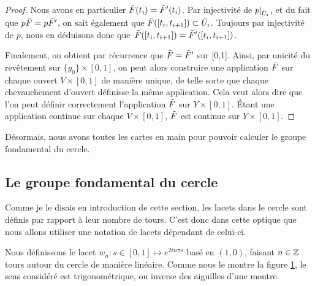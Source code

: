 \begin{proof}
Nous avons en particulier $\Tilde{F}(t_i)=\Tilde{F}'(t_i)$. Par injectivité de $p|_{\Tilde{U}_i}$, et du fait que $p\Tilde{F}=p\Tilde{F}'$, on sait également que $\Tilde{F}([t_i,t_{i+1}])\subset\Tilde{U}_i$. Toujours par injectivité de $p$, nous en déduisons donc que~$\Tilde{F}([t_i,t_{i+1}])=\Tilde{F}'([t_i,t_{i+1}])$.

\bigskip Finalement, on obtient par récurrence que $\Tilde{F}=\Tilde{F}'$ sur [0,1]. Ainsi, par unicité du revêtement sur $\{y_0\}\times[0,1]$, on peut alors construire une application $\Tilde{F}$ sur chaque ouvert $V\times[0,1]$ de manière unique, de telle sorte que chaque chevauchement d'ouvert définisse la même application. Cela veut alors dire que l'on peut définir correctement l'application $\Tilde{F}$ sur $Y\times[0,1]$. Étant une application continue sur chaque $V\times[0,1]$, $\Tilde{F}$ est continue sur $Y\times[0,1]$.
\end{proof}

Désormais, nous avons toutes les cartes en main pour pouvoir calculer le groupe fondamental du cercle.

\subsection{Le groupe fondamental du cercle}

\begin{figure}
    \centering
    \caption{}
    \label{fig:loops-circle}
\end{figure}

Comme je le disais en introduction de cette section, les lacets dans le cercle sont définis par rapport à leur nombre de tours. C'est donc dans cette optique que nous allons utiliser une notation de lacets dépendant de celui-ci.

Nous définissons le lacet $w_n:s\in[0,1]\mapsto e^{2in\pi s}$ basé en $(1,0)$, faisant $n\in\mathbb{Z}$ tours autour du cercle de manière linéaire. Comme nous le montre la figure \ref{fig:loops-circle}, le sens considéré est trigonométrique, ou inverse des aiguilles d'une montre.

